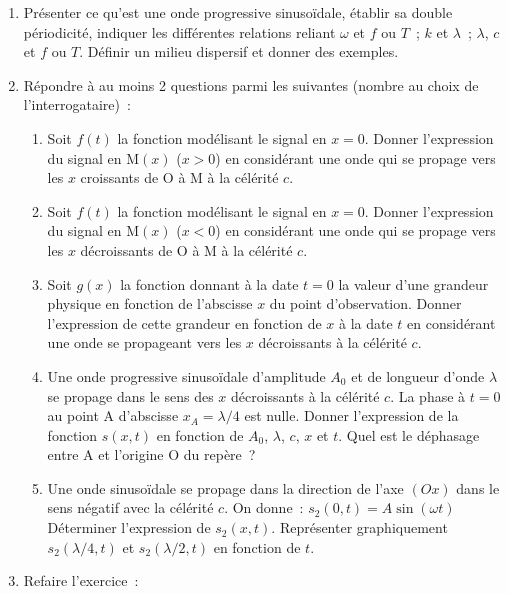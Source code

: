 \documentclass[a4paper, 12pt, final, garamond]{book}
\begin{document}
\begin{enumerate}[resume]
    \item Présenter ce qu'est une onde progressive sinusoïdale, établir sa
        double périodicité, indiquer les différentes relations reliant $\omega$
        et $f$ ou $T$~; $k$ et $\lambda$~; $\lambda$, $c$ et $f$ ou $T$. Définir
        un milieu dispersif et donner des exemples.
    \item Répondre à au moins 2 questions parmi les suivantes (nombre au choix
        de l'interrogataire)~:

        \begin{enumerate}
            \item Soit $f(t)$ la fonction modélisant le signal en $x=0$. Donner
                l'expression du signal en M$(x)$ ($x>0$) en considérant une onde
                qui se propage vers les $x$ croissants de O à M à la
                célérité $c$.

            \item Soit $f(t)$ la fonction modélisant le signal en $x=0$. Donner
                l'expression du signal en M$(x)$ ($x<0$) en considérant une onde
                qui se propage vers les $x$ décroissants de O à M à la
                célérité $c$.

            \item Soit $g(x)$ la fonction donnant à la date $t=0$ la valeur
                d'une grandeur physique en fonction de l'abscisse $x$ du point
                d'observation. Donner l'expression de cette grandeur en fonction
                de $x$ à la date $t$ en considérant une onde se propageant vers
                les $x$ décroissants à la célérité $c$.

            \item Une onde progressive sinusoïdale d'amplitude $A_0$ et de
                longueur d'onde $\lambda$ se propage dans le sens des $x$
                décroissants à la célérité $c$. La phase à $t=0$ au point A
                d'abscisse $x_A = {\lambda}/{4}$ est nulle. Donner l'expression
                de la fonction $s(x,t)$ en fonction de $A_0$, $\lambda$, $c$,
                $x$ et $t$. Quel est le déphasage entre A et l'origine O du
                repère~?

            \item Une onde sinusoïdale se propage dans la direction de l'axe
                $(Ox)$ dans le sens négatif avec la célérité $c$. On donne~:
                \hfill
                $\boxed{s_2(0,t) = A \sin(\omega t)}$
                \hfill~
                \smallbreak
                Déterminer l'expression de $s_2(x,t)$. Représenter graphiquement
                $s_2(\lambda/4,t)$ et $s_2(\lambda/2,t)$ en fonction de $t$.
        \end{enumerate}
    \item Refaire l'exercice~:
\end{enumerate}
\end{document}
